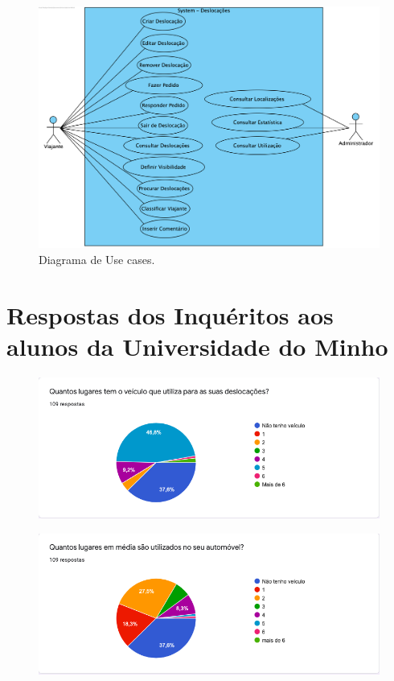 \begin{figure}[H]
    \centering
	\includegraphics[scale=0.70]{imagens/diagrama-use-cases-2.png}
	\caption{Diagrama de Use cases.}
	\label{img:pag}
\end{figure}

\section{Respostas dos Inquéritos aos alunos da Universidade do Minho}

\begin{figure}[H]
    \centering
	\includegraphics[scale=0.65]{imagens/i1.png}
	\label{img:pag}
\end{figure}

\begin{figure}[H]
    \centering
	\includegraphics[scale=0.65]{imagens/i2.png}
	\label{img:pag}
\end{figure}

